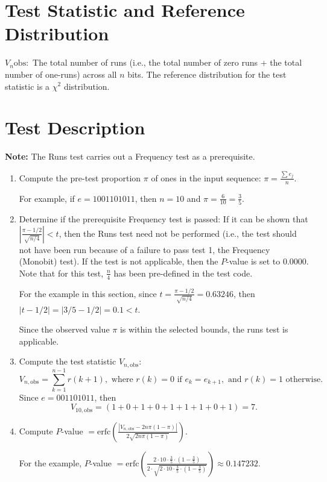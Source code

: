\documentclass[12pt,openany]{book}
\theoremstyle{definition}
\begin{document}
	\section*{Test Statistic and Reference Distribution}
	\( V_n\text{obs}: \) The total number of runs (i.e., the total number of zero runs + the total number of one-runs) across all \( n \) bits.
	The reference distribution for the test statistic is a \( \chi^2 \) distribution.
	
	\section*{Test Description}
	\textbf{Note:} The Runs test carries out a Frequency test as a prerequisite.
	\begin{enumerate}
		\item Compute the pre-test proportion \( \pi \) of ones in the input sequence: \( \pi = \frac{\sum e_j}{n} \).
		
		For example, if \( e = 1001101011 \), then \( n=10 \) and \( \pi = \frac{6}{10} = \frac{3}{5} \).
		
		\item Determine if the prerequisite Frequency test is passed: If it can be shown that \( | \frac{\pi - 1/2}{\sqrt{n/4}} | < t \), then the Runs test need not be performed (i.e., the test should not have been run because of a failure to pass test 1, the Frequency (Monobit) test). If the test is not applicable, then the \( P \)-value is set to 0.0000. Note that for this test, \( \frac{n}{4} \) has been pre-defined in the test code.
		
		For the example in this section, since \( t = \frac{\pi - 1/2}{\sqrt{n/4}} = 0.63246 \), then \( |t - 1/2| = |3/5 - 1/2| = 0.1 < t \).
		
		Since the observed value \( \pi \) is within the selected bounds, the runs test is applicable.
	\end{enumerate}

	\begin{enumerate}
		\setcounter{enumi}{2} %
		\item Compute the test statistic \( V_{n,\text{obs}} \):
		\[
		V_{n,\text{obs}} = \sum_{k=1}^{n-1} r(k+1), \text{ where } r(k)=0 \text{ if } e_k = e_{k+1}, \text{ and } r(k)=1 \text{ otherwise}.
		\]
		Since \( e = 001101011 \), then
		\[
		V_{10,\text{obs}} = (1+0+1+0+1+1+1+0+1) = 7.
		\]
		
		\item Compute \( P \)-value \( = \text{erfc} \left( \frac{|V_{n,\text{obs}} - 2n\pi(1 - \pi)|}{2\sqrt{2n\pi(1 - \pi)}} \right) \).
		
		For the example, \( P \)-value \( = \text{erfc} \left( \frac{2 \cdot 10 \cdot \frac{3}{5} \cdot \left(1 - \frac{3}{5}\right)}{2 \cdot \sqrt{2 \cdot 10 \cdot \frac{3}{5} \cdot \left(1 - \frac{3}{5}\right)}} \right) \approx 0.147232.
		\)
	\end{enumerate}
	
\end{document}
